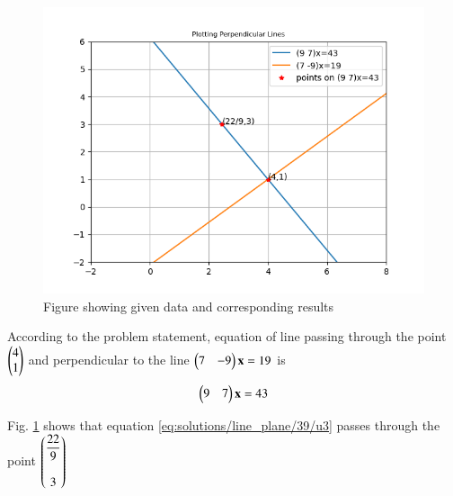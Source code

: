 \begin{figure}[h!] 
	\centering
	\includegraphics[width=\columnwidth]{./solutions/line_plane/39/assignment1_method2_plot.png}
	\caption{Figure showing given data and corresponding results}
	\label{myfig:solutions/line_plane/39/}
\end{figure}

According to the problem statement, equation of line passing through the point $\begin{pmatrix} 4 \\ 1 \end{pmatrix}$ and perpendicular to the line $\begin{pmatrix} 7 & -9 \end{pmatrix}\mathbf{x}=19$ is 
\begin{align}
  \begin{pmatrix} 9 & 7 \end{pmatrix}\mathbf{x}=43
  \label{eq:solutions/line_plane/39/u3}
\end{align}

Fig. \ref{myfig:solutions/line_plane/39/} shows that equation \eqref{eq:solutions/line_plane/39/u3} passes through the point $\begin{pmatrix} \dfrac{22}{9} \\ \\ 3\end{pmatrix}$

